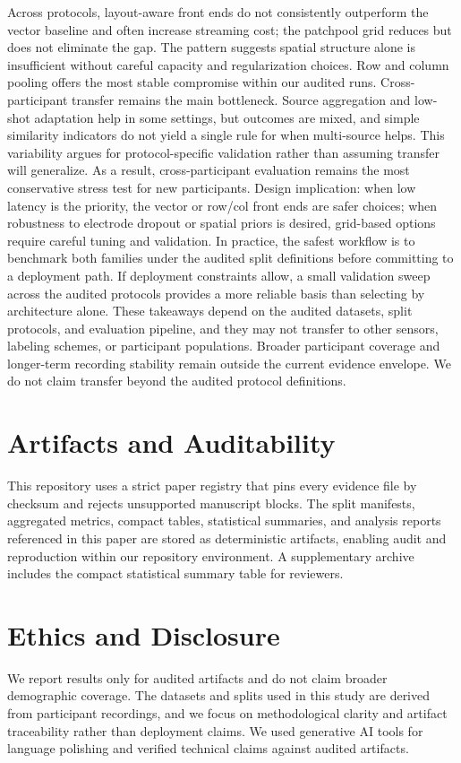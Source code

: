 \documentclass{Interspeech}
\begin{document}
Across protocols, layout-aware front ends do not consistently outperform the vector baseline and often increase streaming cost; the patchpool grid reduces but does not eliminate the gap. The pattern suggests spatial structure alone is insufficient without careful capacity and regularization choices. Row and column pooling offers the most stable compromise within our audited runs.  Cross-participant transfer remains the main bottleneck. Source aggregation and low-shot adaptation help in some settings, but outcomes are mixed, and simple similarity indicators do not yield a single rule for when multi-source helps. This variability argues for protocol-specific validation rather than assuming transfer will generalize. As a result, cross-participant evaluation remains the most conservative stress test for new participants.  Design implication: when low latency is the priority, the vector or row/col front ends are safer choices; when robustness to electrode dropout or spatial priors is desired, grid-based options require careful tuning and validation. In practice, the safest workflow is to benchmark both families under the audited split definitions before committing to a deployment path. If deployment constraints allow, a small validation sweep across the audited protocols provides a more reliable basis than selecting by architecture alone.  These takeaways depend on the audited datasets, split protocols, and evaluation pipeline, and they may not transfer to other sensors, labeling schemes, or participant populations. Broader participant coverage and longer-term recording stability remain outside the current evidence envelope. We do not claim transfer beyond the audited protocol definitions.

\section{Artifacts and Auditability}

This repository uses a strict paper registry that pins every evidence file by checksum and rejects unsupported manuscript blocks. The split manifests, aggregated metrics, compact tables, statistical summaries, and analysis reports referenced in this paper are stored as deterministic artifacts, enabling audit and reproduction within our repository environment. A supplementary archive includes the compact statistical summary table for reviewers.

\section{Ethics and Disclosure}

We report results only for audited artifacts and do not claim broader demographic coverage. The datasets and splits used in this study are derived from participant recordings, and we focus on methodological clarity and artifact traceability rather than deployment claims. We used generative AI tools for language polishing and verified technical claims against audited artifacts.

\clearpage


\end{document}
